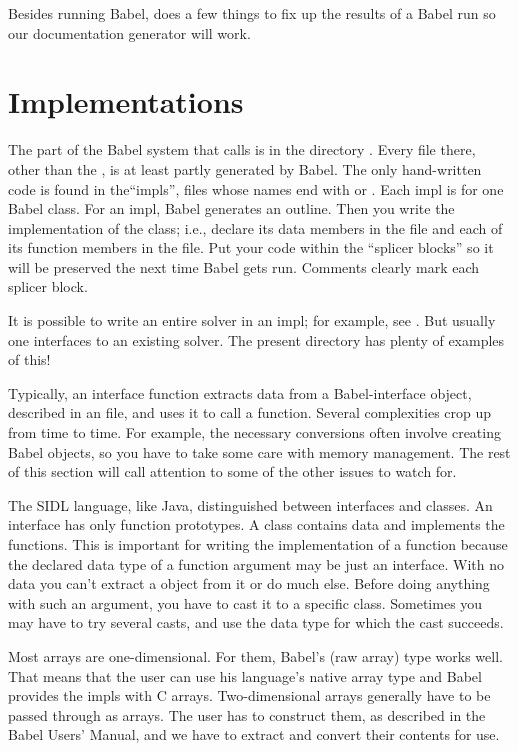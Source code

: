 Besides running Babel,  does a few things to fix up
the results of a Babel run so our documentation generator will work.

\section{Implementations}

The part of the Babel system that calls \hypre{} is in the directory
.  Every file there, other than the , is at
least partly generated by Babel.  The only hand-written code is found
in the``impls'', files whose names end with
 or .  Each impl is for one Babel class.
For an impl, Babel generates an outline.  Then you write the
implementation of the class; i.e., declare its data members in the
 file and each of its function members in the
 file. Put your code within the ``splicer blocks'' so it
will be preserved the next time Babel gets run.  Comments clearly mark
each splicer block.

It is possible to write an entire solver in an impl; for example, see
.  But usually one interfaces to an existing
\hypre{} solver.  The present  directory has plenty of
examples of this!

Typically, an interface function extracts data from a Babel-interface
object, described in an  file, and uses it to call a
 function.  Several complexities crop up from time to
time.  For example, the necessary conversions often involve creating
Babel objects, so you have to take some care with memory management.
The rest of this section will call attention to some of the other
issues to watch for.

The SIDL language, like Java, distinguished between interfaces and
classes.  An interface has only function prototypes.  A class contains
data and implements the functions.  This is important for writing the
implementation of a function because the declared data type of a
function argument may be just an interface.  With no data you can't
extract a \hypre{} object from it or do much else.  Before doing
anything with such an argument, you have to cast it to a specific
class.  Sometimes you may have to try several casts, and use the data
type for which the cast succeeds.

Most \hypre{} arrays are one-dimensional.  For them, Babel's
 (raw array) type works well.  That means that the user
can use his language's native array type and Babel provides the impls
with C arrays.  Two-dimensional arrays generally have to be passed
through as  arrays.  The user has to construct them, as
described in the Babel Users' Manual, and we have to extract and
convert their contents for \hypre{} use.

